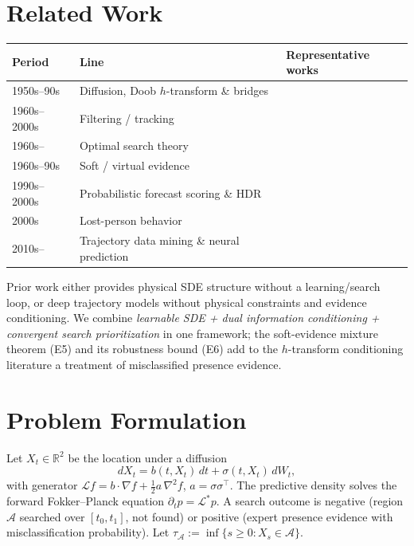 \documentclass[11pt]{article}
\newcommand{\R}{\mathbb{R}}
\newcommand{\Aregion}{\mathcal{A}}
\begin{document}
\section{Related Work}
\label{sec:rel}
\begin{center}
\begin{tabular}{p{2.6cm}p{3.6cm}p{5.2cm}}
\toprule
Period & Line & Representative works \\
\midrule
1950s--90s & Diffusion, Doob $h$-transform \& bridges &
\cite{doob1957,doob1984,pinsky1995,karatzas1991,oksendal2003,rogers2000,fitzsimmons1993} \\
1960s--2000s & Filtering / tracking & \cite{bar2001} \\
1960s-- & Optimal search theory & \cite{stone2004,stone2016} \\
1960s--90s & Soft / virtual evidence & \cite{jeffrey1965,pearl1988} \\
1990s--2000s & Probabilistic forecast scoring \& HDR & \cite{gneiting2007,gneiting2008,hyndman1996} \\
2000s & Lost-person behavior & \cite{koester2008} \\
2010s-- & Trajectory data mining \& neural prediction & \cite{zheng2015trajectory,hochreiter1997} \\
\bottomrule
\end{tabular}
\end{center}
Prior work either provides physical SDE structure without a learning/search loop, or
deep trajectory models without physical constraints and evidence conditioning. We combine
\emph{learnable SDE + dual information conditioning + convergent search prioritization}
in one framework; the soft-evidence mixture theorem (E5) and its robustness bound (E6)
add to the $h$-transform conditioning literature a treatment of misclassified presence
evidence.

\section{Problem Formulation}
\label{sec:problem}
Let $X_t\in\R^2$ be the location under a diffusion
\begin{equation}
  dX_t=b(t,X_t)\,dt+\sigma(t,X_t)\,dW_t,\label{eq:sde}
\end{equation}
with generator $\mathcal{L}f=b\cdot\nabla f+\tfrac12 a\,\nabla^2 f$, $a=\sigma\sigma^\top$.
The predictive density solves the forward Fokker--Planck equation $\partial_t
p=\mathcal{L}^*p$. A search outcome is negative (region $\Aregion$ searched over
$[t_0,t_1]$, not found) or positive (expert presence evidence with misclassification
probability). Let $\tau_{\Aregion}:=\inf\{s\ge 0:X_s\in\Aregion\}$.
\end{document}
